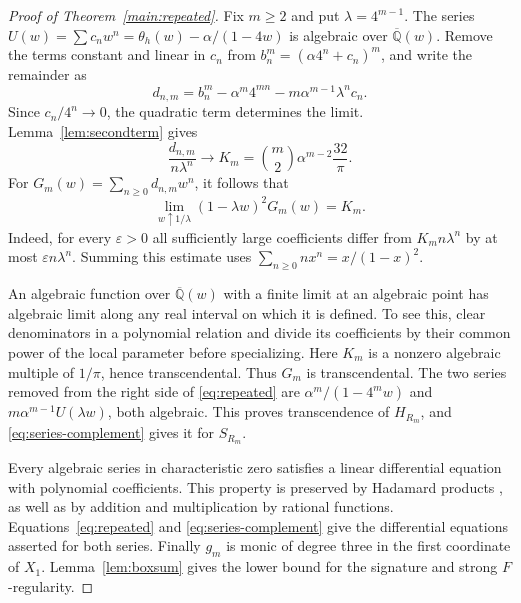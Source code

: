 \documentclass[11pt,a4paper,reqno]{amsart}
\numberwithin{equation}{section}
\theoremstyle{plain}
\begin{document}
\begin{proof}[Proof of Theorem~\ref{main:repeated}]
Fix $m\ge2$ and put $\lambda=4^{m-1}$. The series $U(w)=\sum c_n w^n=\theta_h(w)-\alpha/(1-4w)$ is algebraic over $\overline{\mathbb Q}(w)$. Remove the terms constant and linear in $c_n$ from $b_n^m=(\alpha4^n+c_n)^m$, and write the remainder as
\[
 d_{n,m}=b_n^m-\alpha^m4^{mn}-m\alpha^{m-1}\lambda^n c_n .
\]
Since $c_n/4^n\to0$, the quadratic term determines the limit. Lemma~\ref{lem:secondterm} gives
\[
 \frac{d_{n,m}}{n\lambda^n}\longrightarrow
 K_m=\binom m2\alpha^{m-2}\frac{32}{\pi}.
\]
For $G_m(w)=\sum_{n\ge0}d_{n,m}w^n$, it follows that
\[
 \lim_{w\uparrow 1/\lambda}(1-\lambda w)^2G_m(w)=K_m .
\]
Indeed, for every $\varepsilon>0$ all sufficiently large coefficients differ from $K_m n\lambda^n$ by at most $\varepsilon n\lambda^n$. Summing this estimate uses $\sum_{n\ge0}n x^n=x/(1-x)^2$.

An algebraic function over $\overline{\mathbb Q}(w)$ with a finite limit at an algebraic point has algebraic limit along any real interval on which it is defined. To see this, clear denominators in a polynomial relation and divide its coefficients by their common power of the local parameter before specializing. Here $K_m$ is a nonzero algebraic multiple of $1/\pi$, hence transcendental. Thus $G_m$ is transcendental. The two series removed from the right side of \eqref{eq:repeated} are $\alpha^m/(1-4^m w)$ and $m\alpha^{m-1}U(\lambda w)$, both algebraic. This proves transcendence of $H_{R_m}$, and \eqref{eq:series-complement} gives it for $S_{R_m}$.

Every algebraic series in characteristic zero satisfies a linear differential equation with polynomial coefficients. This property is preserved by Hadamard products \cite[Theorem~2.10]{Stanley}, as well as by addition and multiplication by rational functions. Equations~\eqref{eq:repeated} and \eqref{eq:series-complement} give the differential equations asserted for both series. Finally $g_m$ is monic of degree three in the first coordinate of $X_1$. Lemma~\ref{lem:boxsum} gives the lower bound for the signature and strong $F$-regularity.
\end{proof}
\end{document}
